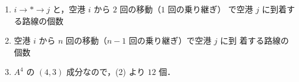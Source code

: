\documentclass[11pt, uplatex, dvipdfmx]{jsarticle}
\begin{document}
\begin{enumerate}
\begin{enumerate}[(1)]
  \item $i \to \ast \to j$ と，空港 $i$ から $2$ 回の移動（$1$ 回の乗り継ぎ）
    で空港 $j$ に到着する路線の個数

  \item 空港 $i$ から $n$ 回の移動（$n-1$ 回の乗り継ぎ）で空港 $j$ に到
    着する路線の個数

  \item $A^4$ の $(4,3)$ 成分なので，(2) より $12$ 個．
  \end{enumerate}
\end{enumerate}
\end{document}
